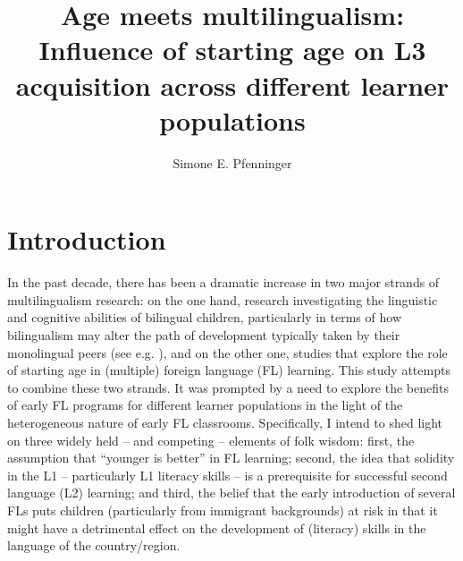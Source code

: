 \documentclass[output=paper,modfonts,nonflat,newtxmath]{langsci/langscibook}
\author{{Simone} {E.} {Pfenninger}\affiliation{University of Salzburg}}
\title{{Age} {meets} {multilingualism:} {Influence} {of} {starting} {age} {on} {L3} {acquisition} {across} {different} {learner} {populations}}
\begin{document}
\maketitle
{}

\section{Introduction}
\label{sec:pfenninger:1}

In the past decade, there has been a dramatic increase in two major strands of multilingualism research: on the one hand, research investigating the linguistic and cognitive abilities of bilingual children, particularly in terms of how bilingualism may alter the path of development typically taken by their monolingual peers (see e.g. \citealt{BialystokFeng2011}), and on the other one, studies that explore the role of starting age in (multiple) foreign language (FL) learning. This study attempts to combine these two strands. It was prompted by a need to explore the benefits of early FL programs for different learner populations in the light of the heterogeneous nature of early FL classrooms. Specifically, I intend to shed light on three widely held – and competing – elements of folk wisdom: first, the assumption that “younger is better” in FL learning; second, the idea that solidity in the L1 – particularly L1 literacy skills – is a prerequisite for successful second language (L2) learning; and third, the belief that the early introduction of several FLs puts children (particularly from immigrant backgrounds) at risk in that it might have a detrimental effect on the development of (literacy) skills in the language of the country/region.
\end{document}
